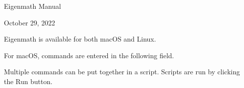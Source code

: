 \documentclass[12pt]{article}
\begin{document}
\begin{center}
{\LARGE Eigenmath Manual}

\bigskip
October 29, 2022
\end{center}

\tableofcontents

\newpage

\noindent
Eigenmath is available for both macOS and Linux.

\bigskip
\noindent
For macOS, commands are entered in the following field.

\begin{center}
\end{center}

\noindent
Multiple commands can be put together in a script.
Scripts are run by clicking the Run button.

\begin{center}
\end{center}
\end{document}
